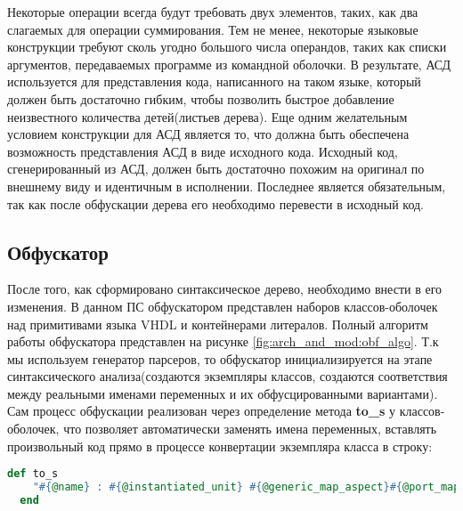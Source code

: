 Некоторые операции всегда будут требовать двух элементов, таких, как два слагаемых для операции суммирования. Тем не менее, некоторые языковые конструкции требуют сколь угодно большого числа операндов, таких как списки аргументов, передаваемых программе из командной оболочки. В результате, АСД используется для представления кода, написанного на таком языке, который должен быть достаточно гибким, чтобы позволить быстрое добавление неизвестного количества детей(листьев дерева).
Еще одним желательным условием конструкции для АСД является то, что должна быть обеспечена возможность представления АСД в виде исходного кода. Исходный код, сгенерированный из АСД, должен быть достаточно похожим на оригинал по внешнему виду и идентичным в исполнении. Последнее является обязательным, так как после обфускации дерева его необходимо перевести в исходный код.

\subsection{Обфускатор}
\label{sub:arch_and_mod:grammars}

После того, как сформировано синтаксическое дерево, необходимо внести в его изменения. В данном ПС обфускатором представлен наборов классов-оболочек над примитивами языка VHDL и контейнерами литералов. Полный алгоритм работы обфускатора представлен на рисунке \ref{fig:arch_and_mod:obf_algo}.
Т.к мы используем генератор парсеров, то обфускатор инициализируется на этапе синтаксического анализа(создаются экземпляры классов, создаются соответствия между реальными именами переменных и их обфусцированными вариантами). Сам процесс обфускации реализован через определение метода \textbf{to\_s}  у классов-оболочек, что позволяет автоматически заменять имена переменных, вставлять произвольный код прямо в процессе конвертации экземпляра класса в строку:

\begin{lstlisting}[language=Ruby, style=rubystyle,caption={Определение метода перевода класса в строку для примитива component instantiation}, label=lst:arch_and_mod:wrapper_to_s]
  def to_s
    "#{@name} : #{@instantiated_unit} #{@generic_map_aspect}#{@port_map_aspect ? '' : ';'}#{@port_map_aspect}"
  end
\end{lstlisting}


